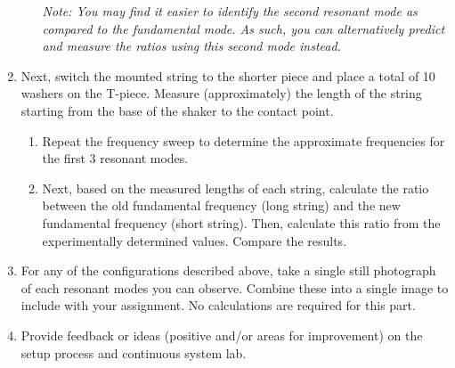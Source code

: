 \documentclass[12pt,letterpaper,english]{article}
\begin{document}
\begin{enumerate}
\begin{enumerate}
{\small \it Note: You may find it easier to identify the second resonant mode as compared to the fundamental mode. As such, you can alternatively predict and measure the ratios using this second mode instead.}
\end{enumerate}
\item Next, switch the mounted string to the shorter piece and place a total of 10 washers on the T-piece. Measure (approximately) the length of the string starting from the base of the shaker to the contact point. 
\begin{enumerate}
\item Repeat the frequency sweep to determine the approximate frequencies for the first 3 resonant modes. 
\item Next, based on the measured lengths of each string, calculate the ratio between the old fundamental frequency (long string) and the new fundamental frequency (short string). Then, calculate this ratio from the experimentally determined values. Compare the results.
\end{enumerate}

\item For any of the configurations described above, take a single still photograph of each resonant modes you can observe.  Combine these into a single image to include with your assignment.  No calculations are required for this part.

\item Provide feedback or ideas (positive and/or areas for improvement) on the setup process and continuous system lab.

\end{enumerate}
\end{document}
